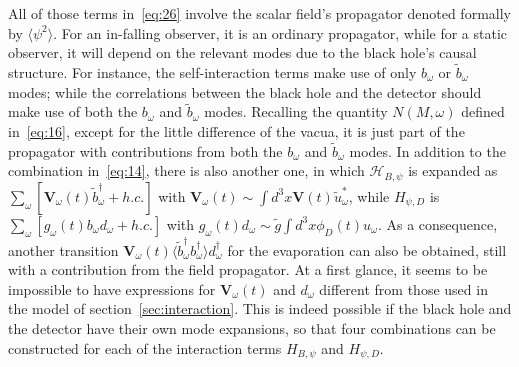 \documentclass[12pt,a4paper]{article}
\begin{document}
All of those terms in~\eqref{eq:26} involve the scalar field's propagator
denoted formally by $\langle\psi^2\rangle$. For an in-falling observer, it is an ordinary propagator, while for a static observer, it will depend on the relevant
modes due to the black hole's causal structure. For instance, the self-interaction terms make use of only $b_{\omega}$ or $\tilde{b}_{\omega}$ modes; while the correlations between the black hole and the detector should make use of both the $b_{\omega}$ and $\tilde{b}_{\omega}$ modes. Recalling the quantity $N(M,\omega)$ defined in~\eqref{eq:16}, except for the little difference of the vacua, it is just part of the propagator with contributions from both the $b_{\omega}$ and $\tilde{b}_{\omega}$ modes. In addition to the combination
in~\eqref{eq:14}, there is also another one, in which $\mathcal {H}_{B,\psi}$ is expanded as
$\sum_{\omega}[\mathbf{V}_{\omega}(t)\tilde{b}_{\omega}^{\dag}+h.c.]$
with $\mathbf{V}_{\omega}(t)\sim \int
d^3x\mathbf{V}(t)\tilde{u}^{*}_{\omega}$, while $H_{\psi,D}$ is $\sum_{\omega}[g_{\omega}(t)b_{\omega}
d_{\omega}+h.c.]$ with $g_{\omega}(t)d_{\omega}\sim \tilde{g}\int d^3x\phi_D(t)u_{\omega}$. As a consequence, another transition $\mathbf{V}_{\omega}(t)\langle\tilde{b}_{\omega}^{\dag}b_{\omega}^{\dag}\rangle
d_{\omega}^{\dag}$ for the evaporation can also be obtained, still with a contribution from the field propagator. At a first glance, it seems to be impossible to have expressions for $\mathbf{V}_{\omega}(t)$ and $d_{\omega}$ different from those used in the model of section~\ref{sec:interaction}. This is indeed possible if the black hole and the detector have their own mode expansions, so that four combinations can be constructed for each of the interaction terms $H_{B,\psi}$ and $H_{\psi,D}$.
\end{document}
